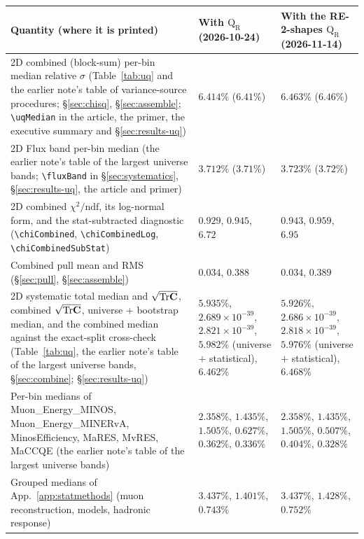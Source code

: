 {\footnotesize
\setlength{\tabcolsep}{3pt}
\begin{longtable}{@{}>{\raggedright\arraybackslash}p{}
                  >{\raggedright\arraybackslash}p{}
                  >{\raggedright\arraybackslash}p{}@{}}
\toprule
Quantity (where it is printed) & With $\mathrm{Q_R}$ (2026-10-24) & With the RE-2-shapes $\mathrm{Q_R}$ (2026-11-14) \\
\midrule
\endhead
2D combined (block-sum) per-bin median relative $\sigma$ (Table~\ref{tab:uq} and the earlier note's table of variance-source procedures; \S\ref{sec:chisq}, \S\ref{sec:assemble}; \texttt{\textbackslash uqMedian} in the article, the primer, the executive summary and \S\ref{sec:results-uq}) & $6.414\%$ ($6.41\%$)  & $6.463\%$ ($6.46\%$)  \\
2D Flux band per-bin median (the earlier note's table of the largest universe bands; \texttt{\textbackslash fluxBand} in \S\ref{sec:systematics}, \S\ref{sec:results-uq}, the article and primer) & $3.712\%$ ($3.71\%$)  & $3.723\%$ ($3.72\%$)  \\
2D combined $\chi^{2}/\mathrm{ndf}$, its log-normal form, and the stat-subtracted diagnostic (\texttt{\textbackslash chiCombined}, \texttt{\textbackslash chiCombinedLog}, \texttt{\textbackslash chiCombinedSubStat}) & $0.929$, $0.945$, $6.72$  & $0.943$, $0.959$, $6.95$  \\
Combined pull mean and RMS (\S\ref{sec:pull}, \S\ref{sec:assemble}) & $0.034$, $0.388$  & $0.034$, $0.389$  \\
2D systematic total median and $\sqrt{\mathrm{Tr}\mathbf{C}}$, combined $\sqrt{\mathrm{Tr}\mathbf{C}}$, universe $+$ bootstrap median, and the combined median against the exact-split cross-check (Table~\ref{tab:uq}, the earlier note's table of the largest universe bands, \S\ref{sec:combine}; \S\ref{sec:results-uq}) & $5.935\%$, $2.689\times10^{-39}$, $2.821\times10^{-39}$, $5.982\%$ (universe $+$ statistical), $6.462\%$  & $5.926\%$, $2.686\times10^{-39}$, $2.818\times10^{-39}$, $5.976\%$ (universe $+$ statistical), $6.468\%$  \\
Per-bin medians of Muon\_Energy\_MINOS, Muon\_Energy\_MINERvA, MinosEfficiency, MaRES, MvRES, MaCCQE (the earlier note's table of the largest universe bands) & $2.358\%$, $1.435\%$, $1.505\%$, $0.627\%$, $0.362\%$, $0.336\%$  & $2.358\%$, $1.435\%$, $1.505\%$, $0.507\%$, $0.404\%$, $0.328\%$  \\
Grouped medians of App.~\ref{app:statmethods} (muon reconstruction, models, hadronic response) & $3.437\%$, $1.401\%$, $0.743\%$  & $3.437\%$, $1.428\%$, $0.752\%$  \\
\bottomrule
\end{longtable}
}

